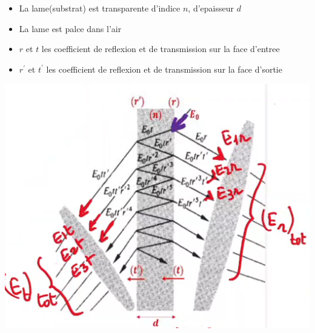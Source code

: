 \documentclass[12pt]{book}
\begin{document}
            \begin{center}
                \begin{minipage}{0.54\linewidth}
                    \begin{itemize}
                        \item La lame(substrat) est transparente d'indice $n$, d'epaisseur $d$ 
                        \item La lame est palce dans l'air
                        \item $r$ et $t$ les coefficient de reflexion et de transmission sur la face d'entree
                        \item $r^{'}$ et $t^{'}$ les coefficient de reflexion et de transmission sur la face d'sortie
                    \end{itemize}
                \end{minipage}
                \begin{minipage}{0.45\linewidth}
                    \includegraphics[width=\linewidth]{pic/lameinair.png}
                \end{minipage}
            \end{center}
\end{document}
